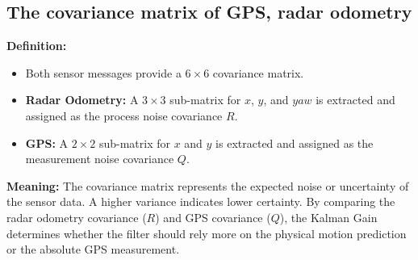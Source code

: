 \documentclass{article}
\begin{document}
\subsection{The covariance matrix of GPS, radar odometry}
\textbf{Definition:}
\begin{itemize}
    \item Both sensor messages provide a $6 \times 6$ covariance matrix.
    \item \textbf{Radar Odometry:} A $3 \times 3$ sub-matrix for $x$, $y$, and $yaw$ is extracted and assigned as the process noise covariance $R$.
    \item \textbf{GPS:} A $2 \times 2$ sub-matrix for $x$ and $y$ is extracted and assigned as the measurement noise covariance $Q$.
\end{itemize}

\textbf{Meaning:}
The covariance matrix represents the expected noise or uncertainty of the sensor data. A higher variance indicates lower certainty. By comparing the radar odometry covariance ($R$) and GPS covariance ($Q$), the Kalman Gain determines whether the filter should rely more on the physical motion prediction or the absolute GPS measurement.
\end{document}
